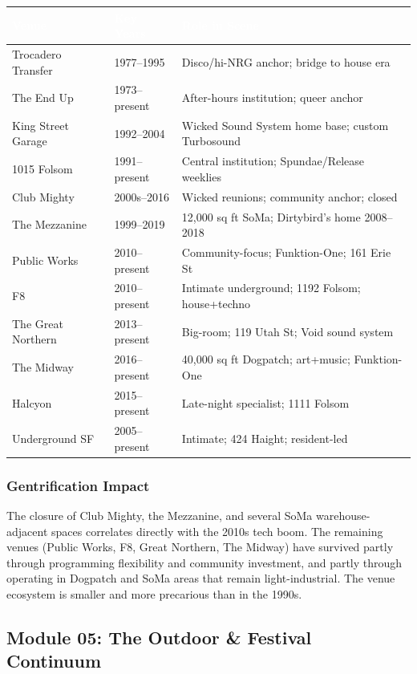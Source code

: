 \documentclass[11pt,letterpaper]{article}
\newcommand{\tableheader}[1]{\textbf{\sffamily\textcolor{white}{#1}}}
\begin{document}
\begin{center}
\begin{tabularx}{\textwidth}{L{3.5cm}C{2.5cm}X}
\toprule
{}
\tableheader{Venue} & \tableheader{Key Years} & \tableheader{Role in Scene} \\
\midrule
Trocadero Transfer & 1977--1995 & Disco/hi-NRG anchor; bridge to house era \\
The End Up & 1973--present & After-hours institution; queer anchor \\
King Street Garage & 1992--2004 & Wicked Sound System home base; custom Turbosound \\
1015 Folsom & 1991--present & Central institution; Spundae/Release weeklies \\
Club Mighty & 2000s--2016 & Wicked reunions; community anchor; closed \\
The Mezzanine & 1999--2019 & 12,000 sq ft SoMa; Dirtybird's home 2008--2018 \\
Public Works & 2010--present & Community-focus; Funktion-One; 161 Erie St \\
F8 & 2010--present & Intimate underground; 1192 Folsom; house+techno \\
The Great Northern & 2013--present & Big-room; 119 Utah St; Void sound system \\
The Midway & 2016--present & 40,000 sq ft Dogpatch; art+music; Funktion-One \\
Halcyon & 2015--present & Late-night specialist; 1111 Folsom \\
Underground SF & 2005--present & Intimate; 424 Haight; resident-led \\
\bottomrule
\end{tabularx}
\end{center}

\subsubsection{Gentrification Impact}

The closure of Club Mighty, the Mezzanine, and several SoMa warehouse-adjacent spaces correlates directly with the 2010s tech boom. The remaining venues (Public Works, F8, Great Northern, The Midway) have survived partly through programming flexibility and community investment, and partly through operating in Dogpatch and SoMa areas that remain light-industrial. The venue ecosystem is smaller and more precarious than in the 1990s.

\subsection{Module 05: The Outdoor \& Festival Continuum}
\end{document}

